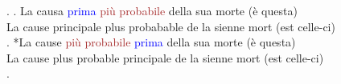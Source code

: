 

\GlossPhantomAlign

\ex. \ag. La causa \textcolor{blue}{prima} \textcolor{brown}{più} \textcolor{brown}{probabile} della sua morte (è questa)\\
La cause principale plus probabable {de la} sienne mort (est celle-ci)\\
\bg. *La cause \textcolor{brown}{più} \textcolor{brown}{probabile} \textcolor{blue}{prima} della sua morte (è questa)\\
La cause plus probable principale {de la} sienne mort (est celle-ci)\\
\z.


